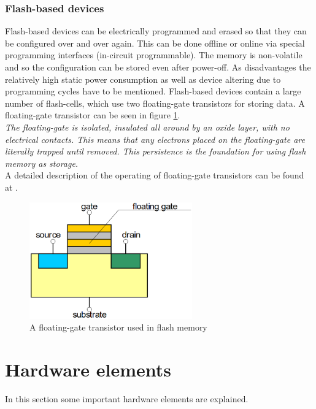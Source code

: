 \subsubsection{Flash-based devices}
Flash-based devices can be electrically programmed and erased so that they can be configured over and over again. This can be done offline or online via special programming interfaces (in-circuit programmable). The memory is non-volatile and so the configuration can be stored even after power-off. As disadvantages the relatively high static power consumption\cite{Qui16} as well as device altering due to programming cycles have to be mentioned. Flash-based devices contain a large number of flash-cells, which use two floating-gate transistors for storing data. A floating-gate transistor can be seen in figure \ref{fig:FlashTransistor}.\\
\textit{The floating-gate is isolated, insulated all around by an oxide layer, with no electrical contacts. This means that any electrons placed on the floating-gate are literally trapped until removed. This persistence is the foundation for using flash memory as storage.}\cite{Flash16}\\
A detailed description of the operating of floating-gate transistors can be found at \cite{Cse16}.\\

\begin{figure}[htbp]
\begin{center}
\includegraphics[width=7cm,keepaspectratio=true]{bilder/png/FlashTransistor}
\caption{A floating-gate transistor used in flash memory\cite{Core16}}
\label{fig:FlashTransistor}
\end{center}
\end{figure}
\section{Hardware elements}
In this section some important hardware elements are explained.
